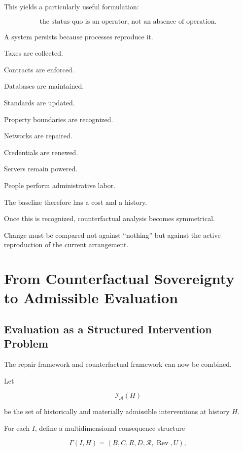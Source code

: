 \documentclass[11pt]{article}
\theoremstyle{remark}
\newcommand{\Adm}{\mathcal{A}}
\newcommand{\Reach}{\mathcal{R}}
\begin{document}
This yields a particularly useful formulation:

\begin{equation}
\boxed{
\text{the status quo is an operator, not an absence of operation}.
}
\end{equation}

A system persists because processes reproduce it.

Taxes are collected.

Contracts are enforced.

Databases are maintained.

Standards are updated.

Property boundaries are recognized.

Networks are repaired.

Credentials are renewed.

Servers remain powered.

People perform administrative labor.

The baseline therefore has a cost and a history.

Once this is recognized, counterfactual analysis becomes symmetrical.

Change must be compared not against ``nothing'' but against the active reproduction of the current arrangement.

\section{From Counterfactual Sovereignty to Admissible Evaluation}

\subsection{Evaluation as a Structured Intervention Problem}

The repair framework and counterfactual framework can now be combined.

Let

\begin{equation}
\mathcal{I}_{\Adm}(H)
\end{equation}

be the set of historically and materially admissible interventions at history $H$.

For each $I$, define a multidimensional consequence structure

\begin{equation}
\Gamma(I,H)
=
(
B,
C,
R,
D,
\Reach,
\operatorname{Rev},
U
),
\end{equation}
\end{document}
